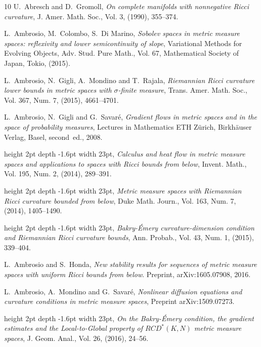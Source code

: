 \documentclass[11pt,reqno]{amsart}
\theoremstyle{definition}
\theoremstyle{remark}
\theoremstyle{remark}
\theoremstyle{remark}
\theoremstyle{remark}
\theoremstyle{remark}
\theoremstyle{remark}
\theoremstyle{remark}
\begin{document}
 \def\cprime{$'$}
\begin{thebibliography}{10}
{\sc U.~Abresch and D.~Gromoll},
  \emph{On complete manifolds with nonnegative Ricci curvature}, J. Amer. Math. Soc., Vol. 3, (1990),  355--374.
  
   
{\sc L.~Ambrosio, M.~Colombo, S.~Di Marino},
  \emph{Sobolev spaces in metric measure spaces: reflexivity and lower semicontinuity of slope}, Variational Methods for Evolving Objects, Adv. Stud. Pure
Math., Vol. 67, Mathematical Society of Japan, Tokio, (2015).
    
{\sc L.~Ambrosio, N.~Gigli, A.~Mondino and T.~Rajala},
  \emph{Riemannian Ricci curvature lower bounds in metric spaces with $\sigma$-finite measure},  Trans. Amer. Math. Soc., Vol. 367, Num. 7,  (2015), 4661--4701.
   

  {\sc L.~Ambrosio, N.~Gigli and G.~Savar\'e},
  {\em Gradient flows in metric spaces and in the space of probability measures}, 
  Lectures in Mathematics ETH Z\"urich, Birkh\"auser Verlag, Basel, second~ed., 2008.


\leavevmode\vrule height 2pt depth -1.6pt width 23pt,
 {\em Calculus and heat flow in
  metric measure spaces and applications to spaces with {R}icci bounds from
  below},  Invent. Math., Vol. 195, Num. 2,  (2014), 289--391.
  
  
\leavevmode\vrule height 2pt depth -1.6pt width 23pt,
 {\em Metric measure
  spaces with {R}iemannian {R}icci curvature bounded from below},  Duke Math. Journ., Vol. 163, Num. 7,  (2014),  1405--1490.


\leavevmode\vrule height 2pt depth -1.6pt width 23pt,
 {\em Bakry-\'{E}mery
  curvature-dimension condition and {R}iemannian {R}icci curvature bounds},
  Ann. Probab., Vol. 43, Num. 1,  (2015), 339--404.
  
{\sc L.~Ambrosio and S.~Honda}, {\em {N}ew stability results for sequences of metric measure spaces with uniform Ricci bounds from below}. Preprint, arXiv:1605.07908, 2016.


  
  {\sc L.~Ambrosio, A.~Mondino and G.~Savar\'e}, 
	{\em  Nonlinear diffusion equations and curvature conditions in
metric measure spaces}, Preprint  arXiv:1509.07273.

\leavevmode\vrule height 2pt depth -1.6pt width 23pt,
  {\em On the Bakry-\'Emery condition, the gradient estimates and the Local-to-Global property of $RCD^*(K,N)$ metric measure spaces},  J. Geom.  Anal.,
Vol.  26, (2016), 24--56.




\end{thebibliography}
\end{document}
